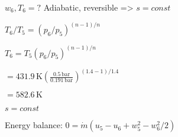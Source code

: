 \( w_6, T_6 = ? \)  
Adiabatic, reversible => \( s = const \)  

\( T_6 / T_5 = (p_6 / p_5)^{(n-1)/n} \)  

\( T_6 = T_5 (p_6 / p_5)^{(n-1)/n} \)  

\( = 431.9 \, \text{K} \left( \frac{0.5 \, \text{bar}}{0.191 \, \text{bar}} \right)^{(1.4-1)/1.4} \)  

\( = 582.6 \, \text{K} \)  

\( s = const \)  

Energy balance:  
\( 0 = \dot{m} (u_5 - u_6 + w_5^2 - w_6^2 / 2) \)